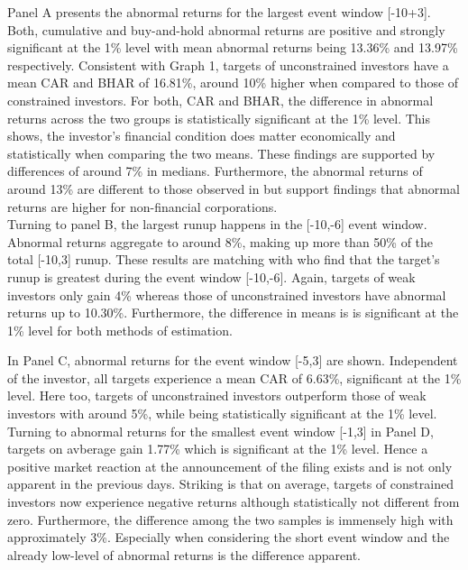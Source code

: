 \documentclass[12pt]{article}
\begin{document}
Panel A presents the abnormal returns for the largest event window [-10+3]. Both, cumulative and buy-and-hold abnormal returns are positive and strongly significant at the 1\% level with mean abnormal returns being 13.36\% and 13.97\% respectively. Consistent with Graph 1, targets of unconstrained investors have a mean CAR and BHAR of 16.81\%, around 10\% higher when compared to those of constrained investors. For both, CAR and BHAR, the difference in abnormal returns across the two groups is statistically significant at the 1\% level. This shows, the investor's financial condition does matter economically and statistically when comparing the two means. These findings are supported by differences of around 7\% in medians. Furthermore, the abnormal returns of around 13\% are different to those observed in \citet[p.208]{Klein2009} but support \citet[p.29]{Brigida2012} findings that abnormal returns are higher for non-financial corporations.\\
Turning to panel B, the largest runup happens in the [-10,-6] event window. Abnormal returns aggregate to around 8\%, making up more than 50\% of the total [-10,3] runup. These results are matching with \citet[p.32]{Brigida2012} who find that the target's runup is greatest during the event window [-10,-6]. Again, targets of weak investors only gain 4\% whereas those of unconstrained investors have abnormal returns up to 10.30\%. Furthermore, the difference in means is is significant at the 1\% level for both methods of estimation.




In Panel C, abnormal returns for the event window [-5,3] are shown. Independent of the investor, all targets experience a mean CAR of 6.63\%, significant at the 1\% level. Here too, targets of unconstrained investors outperform those of weak investors with around 5\%, while being statistically significant at the 1\% level.\\
Turning to abnormal returns for the smallest event window [-1,3] in Panel D, targets on avberage gain 1.77\% which is significant at the 1\% level. Hence a positive market reaction at the announcement of the filing exists and is not only apparent in the previous days. Striking is that on average, targets of constrained investors now experience negative returns although statistically not different from zero. Furthermore, the difference among the two samples is immensely high with approximately 3\%. Especially when considering the short event window and the already low-level of abnormal returns is the difference apparent.
\end{document}
